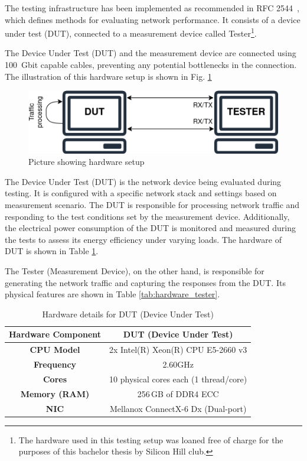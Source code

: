 The testing infrastructure has been implemented as recommended in RFC 2544~\cite{rfc2544}, which defines methods for evaluating network performance. 
It consists of a device under test (DUT), connected to a measurement device called Tester\footnote{The hardware used in this testing setup was loaned free of charge for the purposes of this bachelor thesis by Silicon Hill club.}.

The Device Under Test (DUT) and the measurement device are connected using 100~Gbit capable cables, preventing any potential bottlenecks in the connection.
The illustration of this hardware setup is shown in Fig. \ref{fig:hardware-setup}

\begin{figure}[!htbp]
    \centering
    \includegraphics[width=0.9\linewidth]{images/setup.png}
    \caption{Picture showing hardware setup}
    \label{fig:hardware-setup}
\end{figure}

The Device Under Test (DUT) is the network device being evaluated during testing. 
It is configured with a specific network stack and settings based on measurement scenario.
The DUT is responsible for processing network traffic and responding to the test conditions set by the measurement device.
Additionally, the electrical power consumption of the DUT is monitored and measured during the tests to assess its energy efficiency under varying loads.
The hardware of DUT is shown in Table \ref{tab:hardware_dut}.

The Tester (Measurement Device), on the other hand, is responsible for generating the network traffic and capturing the responses from the DUT.
Its physical features are shown in Table \ref{tab:hardware_tester}. 

\begin{table}[h!]
\centering
\caption{Hardware details for DUT (Device Under Test)}
\begin{tabular}{|c|c|}
\hline
\textbf{Hardware Component} & \textbf{DUT (Device Under Test)} \\
\hline
\textbf{CPU Model} & 2x Intel(R) Xeon(R) CPU E5-2660 v3 \\
\hline
\textbf{Frequency} & 2.60GHz \\
\hline
\textbf{Cores} & 10 physical cores each (1 thread/core) \\
\hline
\textbf{Memory (RAM)} & 256 GB of DDR4 ECC \\
\hline
\textbf{NIC} & Mellanox ConnectX-6 Dx (Dual-port) \\
\hline
\end{tabular}
\label{tab:hardware_dut}
\end{table}


